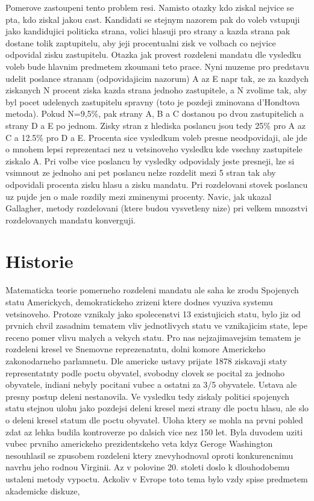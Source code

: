 \documentclass[12pt,a4paper]{report}
\begin{document}
Pomerove zastoupeni tento problem resi.
Namisto otazky kdo ziskal nejvice se pta, kdo ziskal jakou cast. Kandidati se stejnym nazorem pak do voleb vstupuji jako kandidujici politicka strana, volici hlasuji pro strany a kazda strana pak dostane tolik zaptupitelu, aby jeji procentualni zisk ve volbach co nejvice odpovidal zisku zastupitelu.
Otazka jak provest rozdeleni mandatu dle vysledku voleb bude hlavnim predmetem zkoumani teto prace.
Nyni muzeme pro predstavu udelit poslance stranam (odpovidajicim nazorum) A az E napr tak, ze za kazdych ziskanych N procent ziska kazda strana jednoho zastupitele, a N zvolime tak, aby byl pocet udelenych zastupitelu spravny (toto je pozdeji zminovana d'Hondtova metoda).
Pokud N=9,5\%, pak strany A, B a C dostanou po dvou zastupitelich a strany D a E po jednom.
Zisky stran z hlediska poslancu jsou tedy 25\% pro A az C a 12.5\% pro D a E.
Procenta sice vysledkum voleb presne neodpovidaji, ale jde o mnohem lepsi reprezentaci nez u vetsinoveho vysledku kde vsechny zastupitele ziskalo A.
Pri volbe vice poslancu by vysledky odpovidaly jeste presneji, lze si vsimnout ze jednoho ani pet poslancu nelze  rozdelit mezi 5 stran tak aby odpovidali procenta zisku hlasu a zisku mandatu.
Pri rozdelovani stovek poslancu uz pujde jen o male rozdily mezi zminenymi procenty.
Navic, jak ukazal Gallagher, metody rozdelovani (ktere budou vysvetleny nize) pri velkem mnozstvi rozdelovanych mandatu konverguji.\autocite{GAL1}   

\section{Historie}
Matematicka teorie pomerneho rozdeleni mandatu ale saha ke zrodu Spojenych statu Americkych, demokratickeho zrizeni ktere dodnes vyuziva systemu vetsinoveho.\autocite{BAL2}
Protoze vznikaly jako spolecenstvi 13 existujicich statu, bylo jiz od prvnich chvil zasadnim tematem vliv jednotlivych statu ve vznikajicim state, lepe receno pomer vlivu malych a vekych statu.
Pro nas nejzajimavejsim tematem je rozdeleni kresel ve Snemovne reprezenatntu, dolni komore Americkeho zakonodarneho parlamnetu.
Dle americke ustavy prijate 1878 ziskavaji staty representatnty podle poctu obyvatel, svobodny clovek se pocital za jednoho obyvatele, indiani nebyly pocitani vubec a ostatni za 3/5 obyvatele.\autocite{CON}
Ustava ale presny postup deleni nestanovila.
Ve vysledku tedy ziskaly politici spojenych statu stejnou ulohu jako pozdejsi deleni kresel mezi strany dle poctu hlasu, ale slo o deleni kresel statum dle poctu obyvatel. 
Uloha ktery se mohla na prvni pohled zdat az lehka budila kontroverze po dalsich vice nez 150 let.
Byla duvodem uziti vubec prvniho americkeho prezidentskeho veta kdyz Geroge Washington nesouhlasil se zpusobem rozdeleni ktery znevyhodnoval oproti konkurencnimu navrhu jeho rodnou Virginii.\autocite{BAL1}
Az v polovine 20. stoleti doslo k dlouhodobemu ustaleni metody vypoctu.
Ackoliv v Evrope toto tema bylo vzdy spise predmetem akademicke diskuze, 
\end{document}
